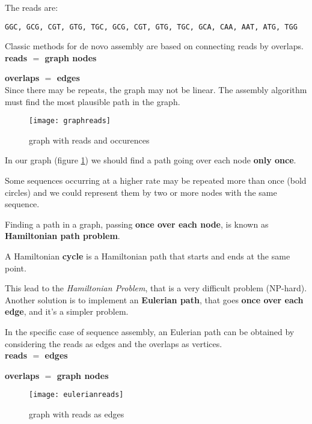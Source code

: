 The reads are:

\texttt{GGC, GCG, CGT, GTG, TGC, GCG, CGT, GTG, TGC, GCA, CAA, AAT, ATG, TGG}

Classic methods for de novo assembly are based on connecting reads by overlaps.\\
 
\textbf{reads $=$ graph nodes}
 
\textbf{overlaps $=$ edges}\\

Since there may be repeats, the graph may not be linear. 
The assembly algorithm must find the most plausible path in the graph.

\begin{figure}[H]
  \centering
  \texttt{[image: graphreads]}
  \caption{graph with reads and occurences}
  \label{fig:graphreads}
\end{figure}

In our graph (figure \ref{fig:graphreads}) we should find a path 
going over each node \textbf{only once}.

Some sequences occurring at a higher rate may be repeated more 
than once (bold circles) and we could represent them by two or more nodes
with the same sequence. 

Finding a path in a graph, passing \textbf{once over each node}, is known as
\textbf{Hamiltonian path problem}.

A Hamiltonian \textbf{cycle} is a Hamiltonian path that starts and ends at
the same point.

This lead to the \textit{Hamiltonian Problem}, that is a
very difficult problem (NP-hard). \\

Another solution is to implement an \textbf{Eulerian path}, that goes
\textbf{once over each edge}, and it's a simpler problem.

In the specific case of sequence assembly, an  Eulerian path can be
obtained by considering the reads as edges and the overlaps as vertices.\\

\textbf{reads $=$ edges}
 
\textbf{overlaps $=$ graph nodes}\\

\begin{figure}[H]
  \centering
  \texttt{[image: eulerianreads]}
  \caption{graph with reads as edges}
  \label{fig:eulerianreads}
\end{figure}

